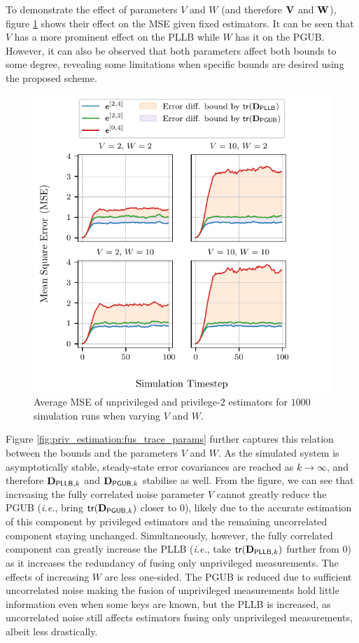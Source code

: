 To demonstrate the effect of parameters $V$ and $W$ (and therefore ${{\mathbf{V}}}$ and ${{\mathbf{W}}}$), figure \ref{fig:priv_estimation:fus_mse_params} shows their effect on the MSE given fixed estimators. It can be seen that $V$ has a more prominent effect on the PLLB while $W$ has it on the PGUB. However, it can also be observed that both parameters affect both bounds to some degree, revealing some limitations when specific bounds are desired using the proposed scheme.
\begin{figure}[htbp]
  \centering
  \includegraphics{figures/priv_estimation_fus_mse_params.pdf}
  \caption{Average MSE of unprivileged and privilege-$2$ estimators for $1000$ simulation runs when varying $V$ and $W$.}
  \label{fig:priv_estimation:fus_mse_params}
\end{figure}
Figure \ref{fig:priv_estimation:fus_trace_params} further captures this relation between the bounds and the parameters $V$ and $W$. As the simulated system is asymptotically stable, steady-state error covariances are reached as $k \to \infty$, and therefore ${{\mathbf{D}}}_{\mathsf{PLLB},k}$ and ${{\mathbf{D}}}_{\mathsf{PGUB},k}$ stabilise as well. From the figure, we can see that increasing the fully correlated noise parameter $V$ cannot greatly reduce the PGUB (\textit{i.e.}, bring $\mathsf{tr}({{\mathbf{D}}}_{\mathsf{PGUB},k})$ closer to $0$), likely due to the accurate estimation of this component by privileged estimators and the remaining uncorrelated component staying unchanged. Simultaneously, however, the fully correlated component can greatly increase the PLLB (\textit{i.e.}, take $\mathsf{tr}({{\mathbf{D}}}_{\mathsf{PLLB},k})$ further from $0$) as it increases the redundancy of fusing only unprivileged measurements. The effects of increasing $W$ are less one-sided. The PGUB is reduced due to sufficient uncorrelated noise making the fusion of unprivileged measurements hold little information even when some keys are known, but the PLLB is increased, as uncorrelated noise still affects estimators fusing only unprivileged measurements, albeit less drastically.

